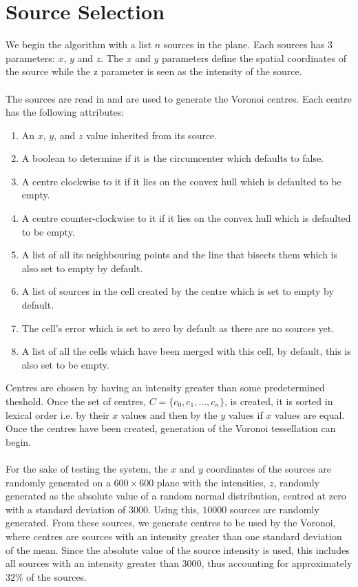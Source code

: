 \section{Source Selection}
We begin the algorithm with a list $n$ sources in the plane. Each sources has 3 parameters: $x$, $y$ and $z$. The $x$ and $y$ parameters define the spatial coordinates of the source while the z parameter is seen as the intensity of the source.
\\
\\
The sources are read in and are used to generate the Voronoi centres. Each centre has the following attributes:
\begin{enumerate}
\item An $x$, $y$, and $z$ value inherited from its source.
\item A boolean to determine if it is the circumcenter which defaults to false.
\item A centre clockwise to it if it lies on the convex hull which is defaulted to be empty.
\item A centre counter-clockwise to it if it lies on the convex hull which is defaulted to be empty.
\item A list of all its neighbouring points and the line that bisects them which is also set to empty by default.
\item A list of sources in the cell created by the centre which is set to empty by default.
\item The cell's error which is set to zero by default as there are no sources yet.
\item A list of all the cells which have been merged with this cell, by default, this is also set to be empty.
\end{enumerate} 
Centres are chosen by having an intensity greater than some predetermined theshold. Once the set of centres, $C= \{c_0,c_1,...,c_n\}$, is created, it is sorted in lexical order i.e. by their $x$ values and then by the $y$ values if $x$ values are equal. Once the centres have been created, generation of the Voronoi tessellation can begin.
\\
\\
For the sake of testing the system, the $x$ and $y$ coordinates of the sources are randomly generated on a $600 \times 600$ plane with the intensities, $z$, randomly generated as the absolute value of a random normal distribution, centred at zero with a standard deviation of $3000$. Using this, $10000$ sources are randomly generated. From these sources, we generate centres to be used by the Voronoi, where centres are sources with an intensity greater than one standard deviation of the mean. Since the absolute value of the source intensity is used, this includes all sources with an intensity greater than 3000, thus accounting for approximately $32\%$ of the sources.

